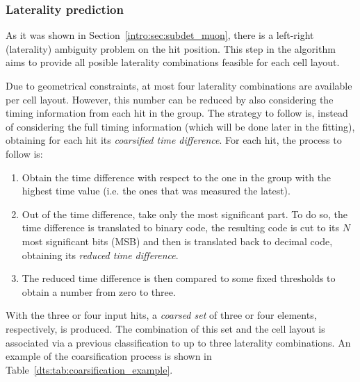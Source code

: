 \documentclass[../main.tex]{subfiles}
\begin{document}
\subsubsection*{Laterality prediction}

As it was shown in Section~\ref{intro:sec:subdet_muon}, there is a left-right (laterality) ambiguity problem on the hit position. This step in the algorithm aims to provide all posible laterality combinations feasible for each cell layout. 

Due to geometrical constraints, at most four laterality combinations are available per cell layout. However, this number can be reduced by also considering the timing information from each hit in the group. The strategy to follow is, instead of considering the full timing information (which will be done later in the fitting), obtaining for each hit its \textit{coarsified time difference}. For each hit, the process to follow is:
\begin{enumerate}
\item Obtain the time difference with respect to the one in the group with the highest time value (i.e. the ones that was measured the latest).
\item Out of the time difference, take only the most significant part. To do so, the time difference is translated to binary code, the resulting code is cut to its $N$ most significant bits (MSB) and then is translated back to decimal code, obtaining its \textit{reduced time difference}.
\item The reduced time difference is then compared to some fixed thresholds to obtain a number from zero to three.
\end{enumerate}

With the three or four input hits, a \textit{coarsed set} of three or four elements, respectively, is produced. The combination of this set and the cell layout is associated via a previous classification to up to three laterality combinations. An example of the coarsification process is shown in Table~\ref{dts:tab:coarsification_example}.
\end{document}

